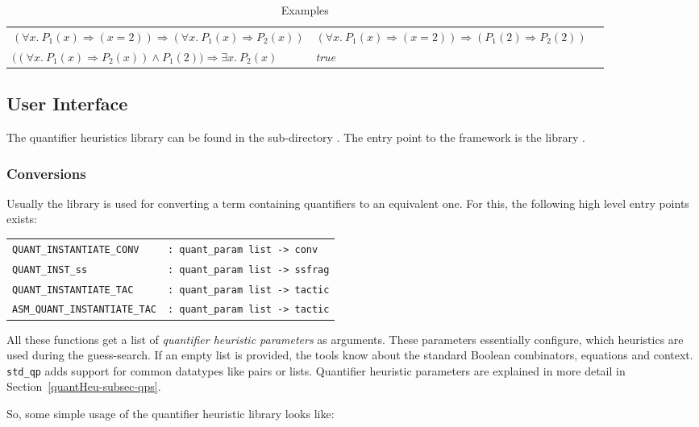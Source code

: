 \begin{table}[h]
\begin{tabular}{lll}
$(\forall x.\ P_1(x) \Rightarrow (x = 2)) \Longrightarrow (\forall x.\ P_1(x) \Rightarrow P_2(x))$ &
$(\forall x.\ P_1(x) \Rightarrow (x = 2)) \Rightarrow (P_1(2) \Rightarrow P_2(2))$ \\

$\big((\forall x.\ P_1(x) \Rightarrow P_2(x)) \wedge P_1(2)\big) \Longrightarrow \exists x.\ P_2(x)$ &
\textit{true} \\
\hline
\end{tabular}
\caption{Examples}
\label{table-qh-examples}
\end{table}

\subsection{User Interface}\label{sec:qh-interface}

The quantifier heuristics library can be found in the sub-directory
.  The entry point to the framework is the
library .

\subsubsection{Conversions}
Usually the library is used for
converting a term containing quantifiers to an equivalent one. For this,
the following high level entry points exists:
\bigskip

\noindent
\begin{tabular}{@{}ll}
\texttt{QUANT\_INSTANTIATE\_CONV} & \texttt{: quant\_param list -> conv} \\
\texttt{QUANT\_INST\_ss} & \texttt{: quant\_param list -> ssfrag} \\
\texttt{QUANT\_INSTANTIATE\_TAC} & \texttt{: quant\_param list -> tactic} \\
\texttt{ASM\_QUANT\_INSTANTIATE\_TAC} & \texttt{: quant\_param list -> tactic}
\end{tabular}
\bigskip

All these functions get a list of \emph{quantifier heuristic parameters} as arguments. These
parameters essentially configure, which heuristics are used during the guess-search. If
an empty list is provided, the tools know about the standard Boolean combinators, equations and context.
\texttt{std\_qp} adds support for common datatypes like pairs or lists.
Quantifier heuristic parameters are explained in more detail in
Section~\ref{quantHeu-subsec-qps}.

So, some simple usage of the quantifier heuristic library looks like:

